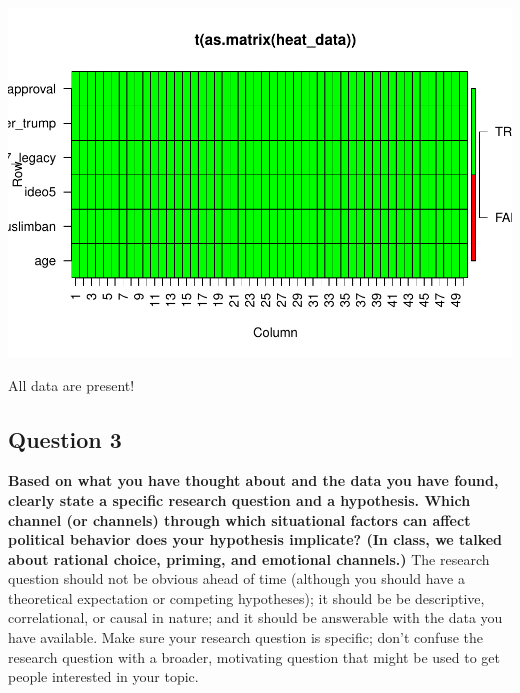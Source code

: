 \documentclass[
]{article}
\newenvironment{Shaded}{\begin{snugshade}}{\end{snugshade}}
\newcommand{\DataTypeTok}[1]{\textcolor[rgb]{0.13,0.29,0.53}{#1}}
\newcommand{\DecValTok}[1]{\textcolor[rgb]{0.00,0.00,0.81}{#1}}
\newcommand{\KeywordTok}[1]{\textcolor[rgb]{0.13,0.29,0.53}{\textbf{#1}}}
\newcommand{\NormalTok}[1]{#1}
\newcommand{\OperatorTok}[1]{\textcolor[rgb]{0.81,0.36,0.00}{\textbf{#1}}}
\newcommand{\StringTok}[1]{\textcolor[rgb]{0.31,0.60,0.02}{#1}}
\begin{document}
\begin{Shaded}
\end{Shaded}

\includegraphics{data_assignment10_nov_11_2021_files/figure-latex/q2-1.pdf}

All data are present!

\hypertarget{question-3}{%
\subsection{Question 3}\label{question-3}}

\textbf{Based on what you have thought about and the data you have
found, clearly state a specific research question and a hypothesis.
Which channel (or channels) through which situational factors can affect
political behavior does your hypothesis implicate? (In class, we talked
about rational choice, priming, and emotional channels.)} The research
question should not be obvious ahead of time (although you should have a
theoretical expectation or competing hypotheses); it should be be
descriptive, correlational, or causal in nature; and it should be
answerable with the data you have available. Make sure your research
question is specific; don't confuse the research question with a
broader, motivating question that might be used to get people interested
in your topic.
\end{document}
